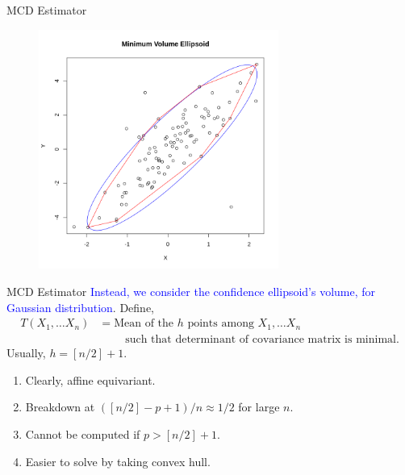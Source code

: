 \documentclass[10pt,xcolor=svgnames]{beamer} %
\begin{document}
\begin{frame}{MCD Estimator}
    \begin{figure}
        \centering
        \includegraphics[width = 0.7\textwidth]{./images/mve2.png}
    \end{figure}
\end{frame}


\begin{frame}{MCD Estimator}
    \textcolor{blue}{Instead, we consider the confidence ellipsoid's volume, for Gaussian distribution}.
    Define,
    \begin{align*}
        T(X_1,\dots X_n) 
        & = \text{Mean of the } h \text{ points among } X_1, \dots X_n \\
        & \qquad \text{ such that determinant of covariance matrix is minimal}.
    \end{align*}
    Usually, $h = [n/2] + 1$.
    \pause
    \begin{enumerate}
        \item Clearly, affine equivariant.
        \item Breakdown at $([n/2]-p+1)/n \approx 1/2$ for large $n$.
        \item Cannot be computed if $p > [n/2]+1$.
        \item Easier to solve by taking convex hull.
    \end{enumerate}
\end{frame}
\end{document}
